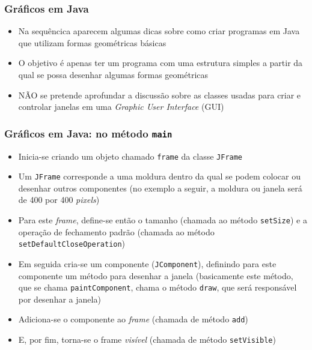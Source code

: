\documentclass[xcolor={dvipsnames,table},aspectratio=169]{beamer}
\begin{document}
\begin{frame}\frametitle{Gráficos em Java}
\begin{itemize}
	\item Na sequêncica aparecem algumas dicas sobre como criar programas em Java que utilizam formas geométricas básicas
	\item O objetivo é apenas ter um programa com uma estrutura simples a partir da qual se possa desenhar algumas formas geométricas
	\item NÃO se pretende aprofundar a discussão sobre as classes usadas para criar e controlar janelas em uma \emph{Graphic User Interface} (GUI)
\end{itemize}
\end{frame}

\begin{frame}\frametitle{Gráficos em Java: no método \texttt{main}}
\begin{itemize}
	\item Inicia-se criando um objeto chamado \texttt{frame} da classe \texttt{JFrame}
	\item Um \texttt{JFrame} corresponde a uma moldura dentro da qual se podem colocar ou desenhar outros componentes (no exemplo a seguir, a moldura ou janela será de 400 por 400 \emph{pixels})
	\item Para este \emph{frame}, define-se então o tamanho (chamada ao método \texttt{setSize}) e a operação de fechamento padrão (chamada ao método \texttt{setDefaultCloseOperation})
	\item Em seguida cria-se um componente (\texttt{JComponent}), definindo para este componente um método para desenhar a janela (basicamente este método, que se chama \texttt{paintComponent}, chama o método \texttt{draw}, que será responsável por desenhar a janela)
	\item Adiciona-se o componente ao \emph{frame} (chamada de método \texttt{add})
	\item E, por fim, torna-se o frame \emph{visível} (chamada de método \texttt{setVisible})
\end{itemize}
\end{frame}
\end{document}
